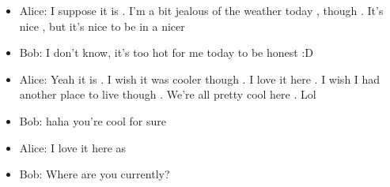 \begin{example}
\leavevmode
\begin{itemize}
\item Alice: I suppose it is . I'm a bit jealous of the weather today , though . It's nice , but it's nice to be in a nicer
\item Bob:   I don't know, it's too hot for me today to be honest :D
\item Alice: Yeah it is . I wish it was cooler though . I love it here . I wish I had another place to live though . We're all pretty cool here . Lol
\item Bob:   haha you're cool for sure
\item Alice: I love it here as
\item Bob:   Where are you currently?
\end{itemize}


\end{example}